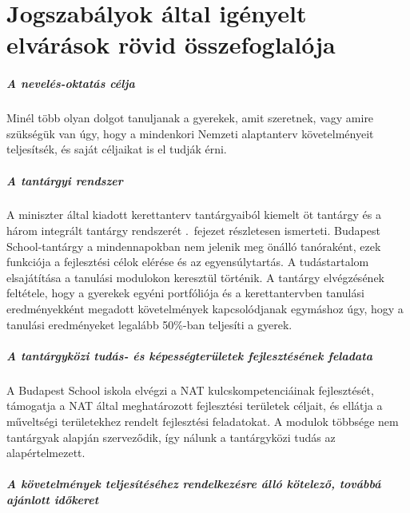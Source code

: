 \chapter{Jogszabályok által igényelt elvárások rövid összefoglalója}
\label{sec:jogszabalyok}
\paragraph{A nevelés-oktatás célja}

Minél több olyan dolgot tanuljanak a gyerekek, amit szeretnek, vagy amire szükségük van úgy, hogy a mindenkori Nemzeti alaptanterv követelményeit teljesítsék, és saját céljaikat is el tudják érni.

\paragraph{A tantárgyi rendszer}

A miniszter által kiadott kerettanterv tantárgyaiból kiemelt öt tantárgy és a három integrált tantárgy rendszerét .~fejezet részletesen ismerteti.  Budapest School-tantárgy a mindennapokban nem jelenik meg önálló tanóraként, ezek funkciója a fejlesztési célok elérése és az egyensúlytartás. A tudástartalom elsajátítása a tanulási modulokon keresztül történik. A tantárgy elvégzésének feltétele, hogy  a gyerekek egyéni portfóliója és a kerettantervben tanulási eredményekként megadott követelmények kapcsolódjanak egymáshoz úgy, hogy a tanulási eredményeket legalább 50\%-ban teljesíti a gyerek.

\paragraph{A tantárgyközi tudás- és képességterületek fejlesztésének feladata}

A Budapest School iskola elvégzi a NAT kulcskompetenciáinak fejlesztését, támogatja a NAT által meghatározott fejlesztési területek céljait, és ellátja a műveltségi területekhez rendelt fejlesztési feladatokat. A modulok többsége nem tantárgyak alapján szerveződik, így nálunk a tantárgyközi tudás az alapértelmezett.

\paragraph{A követelmények teljesítéséhez rendelkezésre álló kötelező, továbbá ajánlott időkeret}

